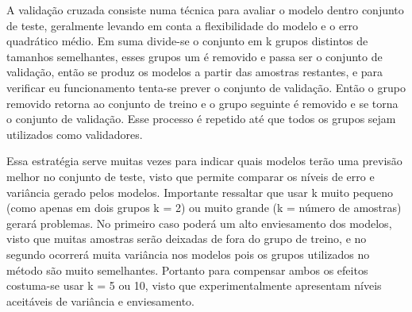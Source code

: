 A validação cruzada consiste numa técnica para avaliar o modelo dentro conjunto de teste, geralmente levando em conta a flexibilidade do modelo e o erro quadrático médio. Em suma divide-se o conjunto em k grupos distintos de tamanhos semelhantes, esses grupos um é removido e passa ser o conjunto de validação, então se produz os modelos a partir das amostras restantes, e para verificar  eu funcionamento tenta-se prever o conjunto de validação. Então o grupo removido retorna ao conjunto de treino e o grupo seguinte é removido e se torna o conjunto de validação. Esse processo é repetido até que todos os grupos sejam utilizados como validadores.

Essa estratégia serve muitas vezes para indicar quais modelos terão uma previsão melhor no conjunto de teste, visto que permite comparar os níveis de erro e variância gerado pelos modelos. Importante ressaltar que usar k muito pequeno (como apenas em dois grupos k = 2) ou muito grande (k = número de amostras) gerará problemas. No primeiro caso poderá um alto enviesamento dos modelos, visto que muitas amostras serão deixadas de fora do grupo de treino, e no segundo ocorrerá muita variância nos modelos pois os grupos utilizados no método são muito semelhantes. Portanto para compensar ambos os efeitos costuma-se usar k = 5 ou 10, visto que experimentalmente apresentam níveis aceitáveis de variância e enviesamento.






